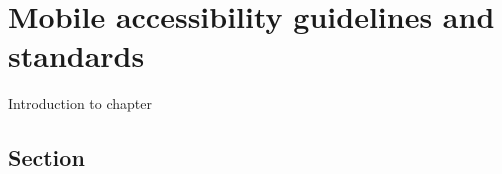 \chapter{Mobile accessibility guidelines and standards}
\label{chap:accessibility}
Introduction to chapter

\section{Section}
\label{sec:second-section}

\newpage